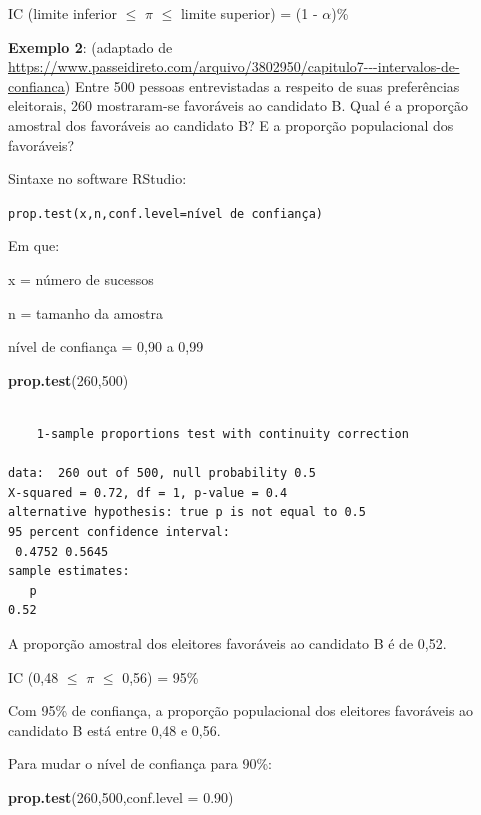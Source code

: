 \documentclass[12pt,brazil,oneside]{book}
\newenvironment{Shaded}{\begin{snugshade}}{\end{snugshade}}
\newcommand{\DataTypeTok}[1]{\textcolor[rgb]{0.13,0.29,0.53}{#1}}
\newcommand{\DecValTok}[1]{\textcolor[rgb]{0.00,0.00,0.81}{#1}}
\newcommand{\FloatTok}[1]{\textcolor[rgb]{0.00,0.00,0.81}{#1}}
\newcommand{\KeywordTok}[1]{\textcolor[rgb]{0.13,0.29,0.53}{\textbf{#1}}}
\newcommand{\NormalTok}[1]{#1}
\begin{document}
IC (limite inferior \(\leq\) \(\pi\) \(\leq\) limite superior) = (1 - \(\alpha\))\%

\textbf{Exemplo 2}: (adaptado de \url{https://www.passeidireto.com/arquivo/3802950/capitulo7---intervalos-de-confianca}) Entre 500 pessoas entrevistadas a respeito de suas preferências eleitorais, 260 mostraram-se favoráveis ao candidato B. Qual é a proporção amostral dos favoráveis ao candidato B? E a proporção populacional dos favoráveis?

Sintaxe no software RStudio:

\texttt{prop.test(x,n,conf.level=nível\ de\ confiança)}

Em que:

x = número de sucessos

n = tamanho da amostra

nível de confiança = 0,90 a 0,99

\begin{Shaded}
\begin{Highlighting}[]
\KeywordTok{prop.test}\NormalTok{(}\DecValTok{260}\NormalTok{,}\DecValTok{500}\NormalTok{)}
\end{Highlighting}
\end{Shaded}

\begin{verbatim}

    1-sample proportions test with continuity correction

data:  260 out of 500, null probability 0.5
X-squared = 0.72, df = 1, p-value = 0.4
alternative hypothesis: true p is not equal to 0.5
95 percent confidence interval:
 0.4752 0.5645
sample estimates:
   p 
0.52 
\end{verbatim}

A proporção amostral dos eleitores favoráveis ao candidato B é de 0,52.

IC (0,48 \(\leq\) \(\pi\) \(\leq\) 0,56) = 95\%

Com 95\% de confiança, a proporção populacional dos eleitores favoráveis ao candidato B está entre 0,48 e 0,56.

Para mudar o nível de confiança para 90\%:

\begin{Shaded}
\begin{Highlighting}[]
\KeywordTok{prop.test}\NormalTok{(}\DecValTok{260}\NormalTok{,}\DecValTok{500}\NormalTok{,}\DataTypeTok{conf.level =} \FloatTok{0.90}\NormalTok{)}
\end{Highlighting}
\end{Shaded}
\end{document}
